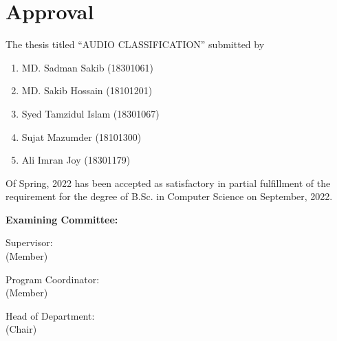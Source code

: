 \section*{Approval}

The thesis titled “AUDIO CLASSIFICATION” submitted by 
\begin{enumerate}
  \item MD. Sadman Sakib (18301061)
  \item MD. Sakib Hossain (18101201)
  \item Syed Tamzidul Islam (18301067) 
  \item Sujat Mazumder (18101300)
  \item Ali Imran Joy (18301179)
\end{enumerate}

Of Spring, 2022 has been accepted as satisfactory in partial fulfillment of the requirement for the degree of B.Sc. in Computer Science on September, 2022. 

\vspace{0.5cm}
\textbf{Examining Committee:}

\vspace{1cm}

Supervisor:\\
(Member)
\begin{center}
    \hspace{7cm}  \hspace{1cm} 
\end{center}

Program Coordinator:\\
(Member)
\begin{center}
    \hspace{7cm}  \hspace{1cm} 
\end{center}

Head of Department:\\
(Chair)
\begin{center}
    \hspace{7cm}  \hspace{1cm} 
\end{center}

\pagebreak